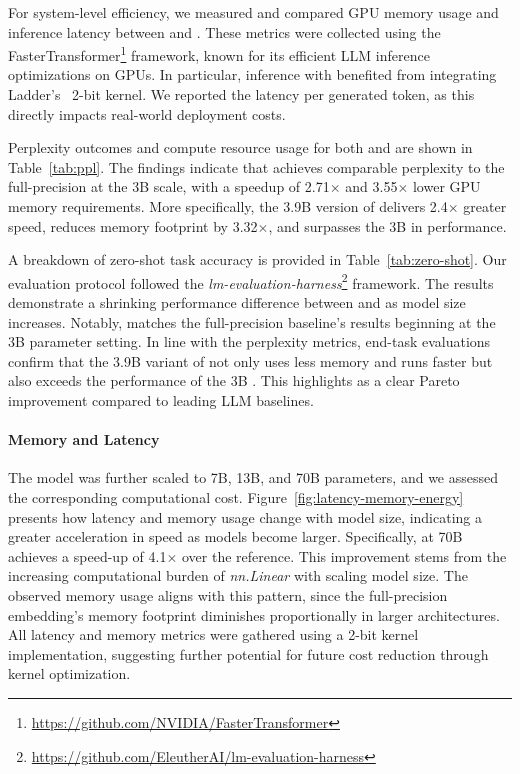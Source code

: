 For system-level efficiency, we measured and compared GPU memory usage and inference latency between  and . These metrics were collected using the FasterTransformer\footnote{\url{https://github.com/NVIDIA/FasterTransformer}} framework, known for its efficient LLM inference optimizations on GPUs. In particular, inference with  benefited from integrating Ladder’s~\cite{ladder} 2-bit kernel. We reported the latency per generated token, as this directly impacts real-world deployment costs.

Perplexity outcomes and compute resource usage for both  and  are shown in Table~\ref{tab:ppl}. The findings indicate that  achieves comparable perplexity to the full-precision  at the 3B scale, with a speedup of 2.71$\times$ and 3.55$\times$ lower GPU memory requirements. More specifically, the 3.9B version of  delivers 2.4$\times$ greater speed, reduces memory footprint by 3.32$\times$, and surpasses the 3B  in performance.

A breakdown of zero-shot task accuracy is provided in Table~\ref{tab:zero-shot}. Our evaluation protocol followed the \emph{lm-evaluation-harness}\footnote{\url{https://github.com/EleutherAI/lm-evaluation-harness}} framework. The results demonstrate a shrinking performance difference between  and  as model size increases. Notably,  matches the full-precision baseline’s results beginning at the 3B parameter setting. In line with the perplexity metrics, end-task evaluations confirm that the 3.9B variant of  not only uses less memory and runs faster but also exceeds the performance of the 3B . This highlights  as a clear Pareto improvement compared to leading LLM baselines.

\paragraph{Memory and Latency}

The model was further scaled to 7B, 13B, and 70B parameters, and we assessed the corresponding computational cost. Figure~\ref{fig:latency-memory-energy} presents how latency and memory usage change with model size, indicating a greater acceleration in speed as models become larger. Specifically,  at 70B achieves a speed-up of 4.1$\times$ over the  reference. This improvement stems from the increasing computational burden of \emph{nn.Linear} with scaling model size. The observed memory usage aligns with this pattern, since the full-precision embedding's memory footprint diminishes proportionally in larger architectures. All latency and memory metrics were gathered using a 2-bit kernel implementation, suggesting further potential for future cost reduction through kernel optimization.

